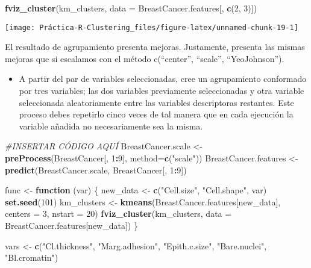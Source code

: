 \documentclass[]{article}
\newenvironment{Shaded}{\begin{snugshade}}{\end{snugshade}}
\newcommand{\CommentTok}[1]{\textcolor[rgb]{0.56,0.35,0.01}{\textit{#1}}}
\newcommand{\ControlFlowTok}[1]{\textcolor[rgb]{0.13,0.29,0.53}{\textbf{#1}}}
\newcommand{\DataTypeTok}[1]{\textcolor[rgb]{0.13,0.29,0.53}{#1}}
\newcommand{\DecValTok}[1]{\textcolor[rgb]{0.00,0.00,0.81}{#1}}
\newcommand{\KeywordTok}[1]{\textcolor[rgb]{0.13,0.29,0.53}{\textbf{#1}}}
\newcommand{\NormalTok}[1]{#1}
\newcommand{\OperatorTok}[1]{\textcolor[rgb]{0.81,0.36,0.00}{\textbf{#1}}}
\newcommand{\StringTok}[1]{\textcolor[rgb]{0.31,0.60,0.02}{#1}}
\providecommand{\tightlist}{%
  \setlength{\itemsep}{0pt}\setlength{\parskip}{0pt}}
\begin{document}
\begin{Shaded}
\begin{Highlighting}[]
\KeywordTok{fviz_cluster}\NormalTok{(km_clusters, }\DataTypeTok{data =}\NormalTok{ BreastCancer.features[, }\KeywordTok{c}\NormalTok{(}\DecValTok{2}\NormalTok{, }\DecValTok{3}\NormalTok{)])}
\end{Highlighting}
\end{Shaded}

\begin{center}\texttt{[image: Práctica-R-Clustering\_files/figure-latex/unnamed-chunk-19-1]} \end{center}

El resultado de agrupamiento presenta mejoras. Justamente, presenta las
mismas mejoras que si escalamos con el método c(``center'', ``scale'',
``YeoJohnson'').

\begin{itemize}
\tightlist
\item
  A partir del par de variables seleccionadas, cree un agrupamiento
  conformado por tres variables; las dos variables previamente
  seleccionadas y otra variable seleccionada aleatoriamente entre las
  variables descriptoras restantes. Este proceso debes repetirlo cinco
  veces de tal manera que en cada ejecución la variable añadida no
  necesariamente sea la misma.
\end{itemize}

\begin{Shaded}
\begin{Highlighting}[]
\CommentTok{#INSERTAR CÓDIGO AQUÍ}
\NormalTok{BreastCancer.scale <-}\StringTok{ }\KeywordTok{preProcess}\NormalTok{(BreastCancer[, }\DecValTok{1}\OperatorTok{:}\DecValTok{9}\NormalTok{], }\DataTypeTok{method=}\KeywordTok{c}\NormalTok{(}\StringTok{"scale"}\NormalTok{))}
\NormalTok{BreastCancer.features <-}\StringTok{ }\KeywordTok{predict}\NormalTok{(BreastCancer.scale, BreastCancer[, }\DecValTok{1}\OperatorTok{:}\DecValTok{9}\NormalTok{])}

\NormalTok{func <-}\StringTok{ }\ControlFlowTok{function}\NormalTok{ (var) \{ }
\NormalTok{  new_data <-}\StringTok{ }\KeywordTok{c}\NormalTok{(}\StringTok{"Cell.size"}\NormalTok{, }\StringTok{"Cell.shape"}\NormalTok{, var)}
  \KeywordTok{set.seed}\NormalTok{(}\DecValTok{101}\NormalTok{)}
\NormalTok{  km_clusters <-}\StringTok{ }\KeywordTok{kmeans}\NormalTok{(BreastCancer.features[new_data], }\DataTypeTok{centers =} \DecValTok{3}\NormalTok{, }\DataTypeTok{nstart =} \DecValTok{20}\NormalTok{)}
  \KeywordTok{fviz_cluster}\NormalTok{(km_clusters, }\DataTypeTok{data =}\NormalTok{ BreastCancer.features[new_data])}
\NormalTok{\}}

\NormalTok{vars <-}\StringTok{ }\KeywordTok{c}\NormalTok{(}\StringTok{"Cl.thickness"}\NormalTok{, }\StringTok{"Marg.adhesion"}\NormalTok{, }\StringTok{"Epith.c.size"}\NormalTok{, }\StringTok{"Bare.nuclei"}\NormalTok{, }\StringTok{"Bl.cromatin"}\NormalTok{)}
\end{Highlighting}
\end{Shaded}
\end{document}
